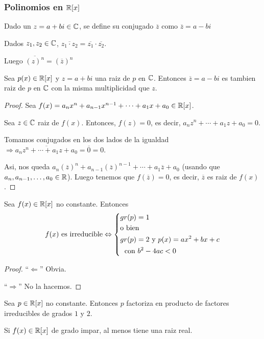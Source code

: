 \subsubsection{Polinomios en \(\R[x ]\)}
\begin{definition}
	Dado un \(z = a + bi \in \C \), se define su conjugado \(\overline{z }\) como \(\overline{z} = a - bi \)
\end{definition}
\begin{remark}
	Dados \(z_1,z_2 \in \C \), \(\overline{z_1 \cdot z_2} = \overline{z_1} \cdot \overline{z_2 }\).
	
	Luego \(\overline{(z)^{n} } = (\overline{z})^{n} \)
\end{remark}
\begin{proposition}
	Sea \(p(x) \in \R[x ]\) y \(z = a + bi \) una raiz de \(p \) en \(\C \). Entonces \(\overline{z} = a - bi \) es tambien raiz de \(p \) en \(\C \) con la misma multiplicidad que \(z \).
\end{proposition}
\begin{proof}
	Sea \(f(x) = a_n x^{n} + a_{n-1} x^{n-1} + \cdots + a_1 x + a_0  \in \R[x]\).
	
	Sea \(z \in \C \) raiz de \(f(x )\). Entonces, \(f(z) = 0 \), es decir, \(a_n z^{n} + \cdots + a_1 z + a_0 = 0\).
	
	Tomamos conjugados en los dos lados de la igualdad \(\Rightarrow \overline{a_n z^{n} + \cdots + a_1 z + a_0} = \overline{0} = 0 \).
	
	Asi, nos queda \(a_n (\overline{z})^{n} + a_{n-1} (\overline{z})^{n-1} + \cdots + a_1 \overline{z} + a_0  \) (usando que \(a_n, a_{n-1}, \ldots, a_0 \in \R \)). Luego tenemos que \(f(\overline{z}) = 0 \), es decir, \(\overline{z }\) es raiz de \(f(x )\).
\end{proof}
\begin{theorem}
	Sea \(f(x) \in \R[x ]\) no constante. Entonces
	\[
		f(x) \text{ es irreducible} \iff \begin{dcases}
			gr(p) = 1                                   \\
			\text{o bien}                               \\
			gr(p) = 2 \text{ y } p(x) = ax^{2} + bx + c \\
			\; \text{ con }b^{2} - 4ac < 0
		\end{dcases}
	\]
\end{theorem}
\begin{proof}
	``\(\Leftarrow \)'' Obvia.
	
	``\(\Rightarrow \)'' No la hacemos.
\end{proof}
\begin{corollary}
	Sea \(p \in \R[x ]\) no constante. Entonces \(p \) factoriza en producto de factores irreducibles de grados \(1 \) y \(2 \).
\end{corollary}
\begin{corollary}
	Si \(f(x) \in \R[x ]\) de grado impar, al menos tiene una raiz real.
\end{corollary}

